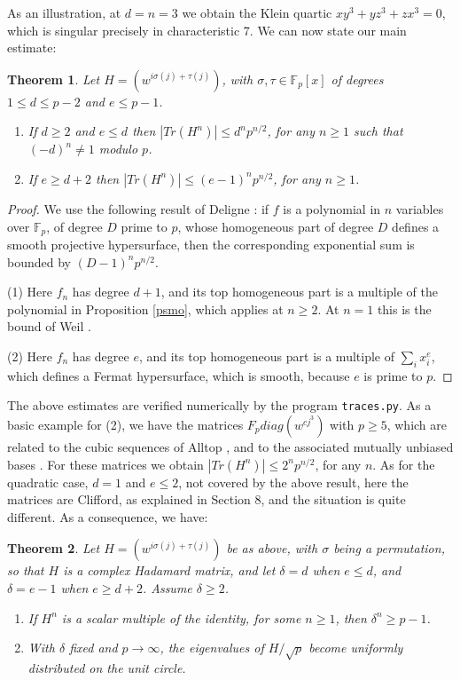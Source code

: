 \documentclass[11pt]{amsart}
\newtheorem{theorem}{Theorem}[section]
\theoremstyle{definition}
\begin{document}
As an illustration, at $d=n=3$ we obtain the Klein quartic $xy^3+yz^3+zx^3=0$, which is singular precisely in characteristic 7. We can now state our main estimate:

\begin{theorem}\label{tdel}
Let $H=(w^{i\sigma(j)+\tau(j)})$, with $\sigma,\tau\in\mathbb F_p[x]$ of degrees $1\leq d\leq p-2$ and $e\leq p-1$.
\begin{enumerate}
\item If $d\geq2$ and $e\leq d$ then $|Tr(H^n)|\leq d^np^{n/2}$, for any $n\geq1$ such that $(-d)^n\neq1$ modulo $p$.

\item If $e\geq d+2$ then $|Tr(H^n)|\leq(e-1)^np^{n/2}$, for any $n\geq1$.
\end{enumerate}
\end{theorem}

\begin{proof}
We use the following result of Deligne \cite{dw1}: if $f$ is a polynomial in $n$ variables over $\mathbb F_p$, of degree $D$ prime to $p$, whose homogeneous part of degree $D$ defines a smooth projective hypersurface, then the corresponding exponential sum is bounded by $(D-1)^np^{n/2}$.

\medskip

(1) Here $f_n$ has degree $d+1$, and its top homogeneous part is a multiple of the polynomial in Proposition \ref{psmo}, which applies at $n\geq2$. At $n=1$ this is the bound of Weil \cite{we1}.

\medskip

(2) Here $f_n$ has degree $e$, and its top homogeneous part is a multiple of $\sum_ix_i^e$, which defines a Fermat hypersurface, which is smooth, because $e$ is prime to $p$.
\end{proof}

The above estimates are verified numerically by the program \texttt{traces.py}. As a basic example for (2), we have the matrices $F_pdiag(w^{cj^3})$ with $p\geq5$, which are related to the cubic sequences of Alltop \cite{all}, and to the associated mutually unbiased bases \cite{krt}. For these matrices we obtain $|Tr(H^n)|\leq2^np^{n/2}$, for any $n$. As for the quadratic case, $d=1$ and $e\leq2$, not covered by the above result, here the matrices are Clifford, as explained in Section 8, and the situation is quite different. As a consequence, we have:

\begin{theorem}\label{tequ}
Let $H=(w^{i\sigma(j)+\tau(j)})$ be as above, with $\sigma$ being a permutation, so that $H$ is a complex Hadamard matrix, and let $\delta=d$ when $e\leq d$, and $\delta=e-1$ when $e\geq d+2$. Assume $\delta\geq2$.
\begin{enumerate}
\item If $H^n$ is a scalar multiple of the identity, for some $n\geq1$, then $\delta^n\geq p-1$.

\item With $\delta$ fixed and $p\to\infty$, the eigenvalues of $H/\sqrt{p}$ become uniformly distributed on the unit circle.
\end{enumerate}
\end{theorem}
\end{document}
